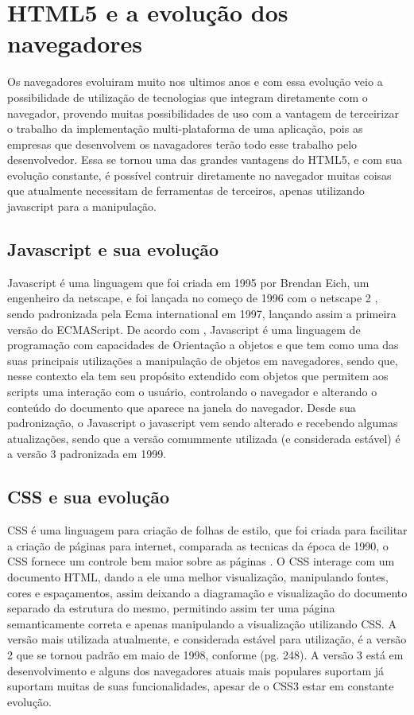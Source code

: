 \section{HTML5 e a evolução dos navegadores}

Os navegadores evoluiram muito nos ultimos anos e com essa evolução
veio a possibilidade de utilização de tecnologias que integram
diretamente com o navegador, provendo muitas possibilidades de uso com
a vantagem de terceirizar o trabalho da implementação multi-plataforma
de uma aplicação, pois as empresas que desenvolvem os navagadores
terão todo esse trabalho pelo desenvolvedor. Essa se tornou uma das
grandes vantagens do HTML5, e com sua evolução constante, é possível
contruir diretamente no navegador muitas coisas que atualmente necessitam
de ferramentas de terceiros, apenas utilizando javascript para a
manipulação.

\subsection{Javascript e sua evolução}

Javascript é uma linguagem que foi criada em 1995 por Brendan Eich,
um engenheiro da netscape, e foi lançada no começo de 1996 com o
netscape 2 \cite{mdnjavascript}, sendo padronizada pela Ecma
international em 1997, lançando assim a primeira versão do ECMAScript.
De acordo com \cite{flanagan2006javascript}, Javascript é uma linguagem de programação
com capacidades de Orientação a objetos e que tem como uma das suas principais
utilizações a manipulação de objetos em navegadores, sendo que, nesse contexto
ela tem seu propósito extendido com objetos que permitem aos scripts uma interação com o usuário,
controlando o navegador e alterando o conteúdo do documento que aparece na janela do navegador.
Desde sua padronização, o Javascript o javascript vem sendo alterado e
recebendo algumas atualizações, sendo que a versão comummente
utilizada (e considerada estável) é a versão 3 padronizada em 1999.

\subsection{CSS e sua evolução}

CSS é uma linguagem para criação de folhas de estilo, que foi criada
para facilitar a criação de páginas para internet, comparada as tecnicas da época de
1990, o CSS fornece um controle bem maior sobre as páginas \cite{schmitt2009css}.
O CSS interage com um documento HTML, dando a ele uma melhor visualização, manipulando
fontes, cores e espaçamentos, assim deixando a diagramação e visualização do documento
separado da estrutura do mesmo, permitindo assim ter uma página semanticamente correta
e apenas manipulando a visualização utilizando CSS.
A versão mais utilizada atualmente, e considerada estável para utilização, é a versão 2
que se tornou padrão em maio de 1998, conforme \cite{zeldman2009designing}(pg. 248).
A versão 3 está em desenvolvimento e alguns dos navegadores atuais mais populares suportam
já suportam muitas de suas funcionalidades, apesar de o CSS3 estar em constante evolução.

